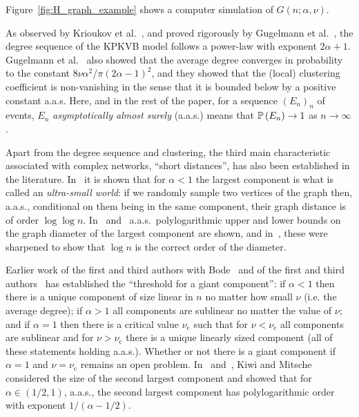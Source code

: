 \noindent
Figure~\ref{fig:H_graph_example} shows a computer simulation of $G(n;\alpha, \nu)$.


As observed by Krioukov et al.~\cite{krioukov2010hyperbolic}, and proved rigorously by Gugelmann et al.~\cite{gugelmann2012random}, the 
degree sequence of the KPKVB model follows a power-law with exponent $2\alpha+1$.
Gugelmann et al.~\cite{gugelmann2012random} also showed that the average degree converges in probability to the 
constant $8\nu\alpha^2/ \pi (2\alpha-1)^2$, and they showed that the (local) clustering coefficient is non-vanishing 
in the sense that it is bounded below by a positive constant a.a.s. 
Here, and in the rest of the paper, for a sequence $(E_n)_n$ of events, $E_n$ {\em asymptotically almost surely} (a.a.s.) means 
that $\mathbb{P}\left(E_n\right) \to 1$ as $n \to \infty$. 

Apart from the degree sequence and clustering, the third main characteristic associated with complex networks, ``short distances'', has 
also been established in the literature. In~\cite{abdullah2017typical} it is shown that for $\alpha < 1$ the largest component 
is what is called an \emph{ultra-small world}: if we randomly sample two vertices of the graph then, a.a.s., conditional on them 
being in the same component, their graph distance is of order $\log\log n$. 
In~\cite{kiwi2015bound} and~\cite{friedrich2018diameter} a.a.s.~polylogarithmic upper and lower bounds on the graph diameter of 
the largest component are shown, and in~\cite{muller2017diameter}, these were sharpened to show that $\log n$ is the correct order of 
the diameter.

Earlier work of the first and third authors with Bode~\cite{bode2015largest} and of the first and third authors~\cite{fountoulakis2018law} has established the ``threshold for a giant component'': if $\alpha < 1$ then there is a unique component of size linear in $n$ no matter how small $\nu$ (i.e. the average degree); if $\alpha > 1$ all components are sublinear no matter the value of $\nu$; and if $\alpha=1$ then there is a critical value $\nu_{\text{c}}$ such that for $\nu < \nu_{\text{c}}$ all components are sublinear and for $\nu > \nu_{\text{c}}$ there is a unique linearly sized component (all of these statements holding a.a.s.). Whether or not there is a giant component if $\alpha=1$ and $\nu=\nu_{\text{c}}$ remains an open problem. In~\cite{kiwi2015bound} and~\cite{kiwi2017second}, Kiwi and Mitsche considered the size of the second largest component and showed that for $\alpha \in (1/2, 1)$, a.a.s., the second largest component has polylogarithmic order with exponent $1/(\alpha -1/2)$.


